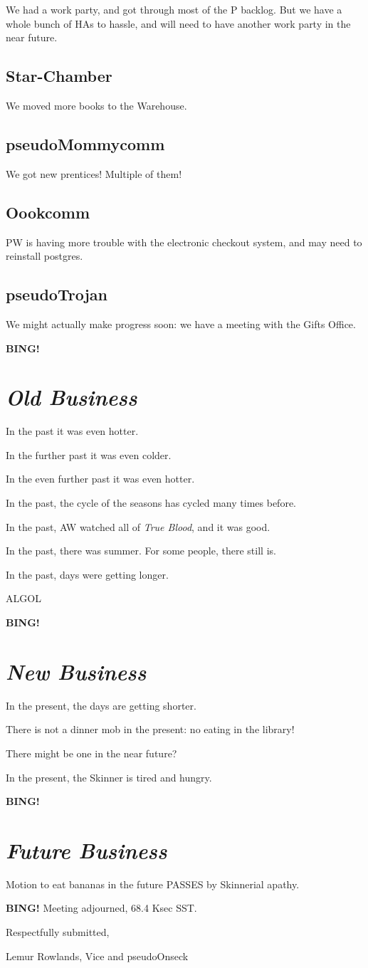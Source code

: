 \documentclass[10pt]{article}
\newcommand{\bing}{{\bf BING!} }
\newcommand{\goto}[1]{\bing \vskip 12pt \section*{{\em{#1}}}}
\newcommand{\onseck}{Lemur Rowlands, Vice and pseudoOnseck}
\begin{document}
We had a work party, and got through most of the P backlog.  But we have
a whole bunch of HAs to hassle, and will need to have another work party
in the near future.


\subsection*{Star-Chamber}

We moved more books to the Warehouse.


\subsection*{pseudoMommycomm}

We got new prentices!  Multiple of them!


\subsection*{Oookcomm}

PW is having more trouble with the electronic checkout system, and may
need to reinstall postgres.


\subsection*{pseudoTrojan}

We might actually make progress soon: we have a meeting with the Gifts
Office.


\goto{Old Business}

In the past it was even hotter.

In the further past it was even colder.

In the even further past it was even hotter.

In the past, the cycle of the seasons has cycled many times before.

In the past, AW watched all of \emph{True Blood}, and it was good.

In the past, there was summer.  For some people, there still is.

In the past, days were getting longer.

ALGOL


\goto{New Business}

In the present, the days are getting shorter.

There is not a dinner mob in the present: no eating in the library!

There might be one in the near future?

In the present, the Skinner is tired and hungry.


\goto{Future Business}

Motion to eat bananas in the future PASSES by Skinnerial apathy.


\bing
\noindent
Meeting adjourned, 68.4 Ksec SST.

\vspace{18pt}

\centerline{Respectfully submitted,}
\centerline{\onseck}
\end{document}
